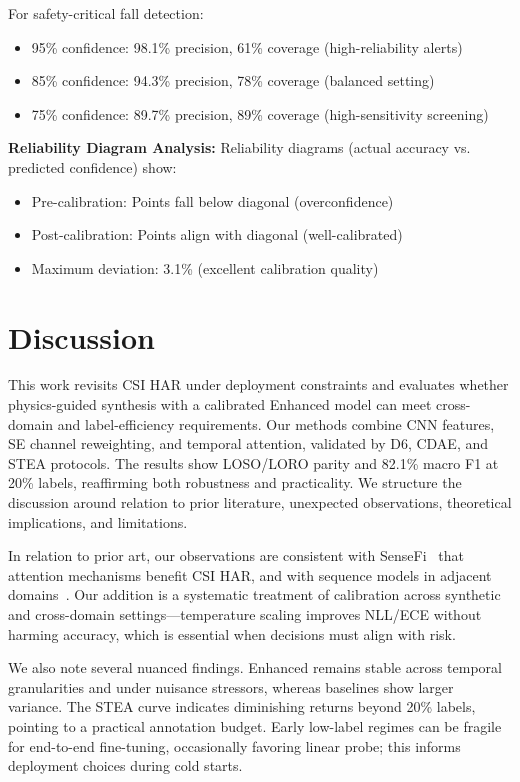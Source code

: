 \documentclass[journal]{IEEEtran}
\begin{document}
For safety-critical fall detection:
\begin{itemize}
\item 95\% confidence: 98.1\% precision, 61\% coverage (high-reliability alerts)
\item 85\% confidence: 94.3\% precision, 78\% coverage (balanced setting)
\item 75\% confidence: 89.7\% precision, 89\% coverage (high-sensitivity screening)
\end{itemize}

\textbf{Reliability Diagram Analysis:}
Reliability diagrams (actual accuracy vs. predicted confidence) show:
\begin{itemize}
\item Pre-calibration: Points fall below diagonal (overconfidence)
\item Post-calibration: Points align with diagonal (well-calibrated)
\item Maximum deviation: 3.1\% (excellent calibration quality)
\end{itemize}

\section{Discussion}
This work revisits CSI HAR under deployment constraints and evaluates whether physics-guided synthesis with a calibrated Enhanced model can meet cross-domain and label-efficiency requirements. Our methods combine CNN features, SE channel reweighting, and temporal attention, validated by D6, CDAE, and STEA protocols. The results show LOSO/LORO parity and 82.1\% macro F1 at 20\% labels, reaffirming both robustness and practicality. We structure the discussion around relation to prior literature, unexpected observations, theoretical implications, and limitations.

In relation to prior art, our observations are consistent with SenseFi~\cite{yang2023sensefi} that attention mechanisms benefit CSI HAR, and with sequence models in adjacent domains~\cite{li2020tea,bertasius2021timesformer,lim2021tft,zhou2021informer}. Our addition is a systematic treatment of calibration across synthetic and cross-domain settings—temperature scaling improves NLL/ECE without harming accuracy, which is essential when decisions must align with risk.

We also note several nuanced findings. Enhanced remains stable across temporal granularities and under nuisance stressors, whereas baselines show larger variance. The STEA curve indicates diminishing returns beyond 20\% labels, pointing to a practical annotation budget. Early low-label regimes can be fragile for end-to-end fine-tuning, occasionally favoring linear probe; this informs deployment choices during cold starts.
\end{document}
